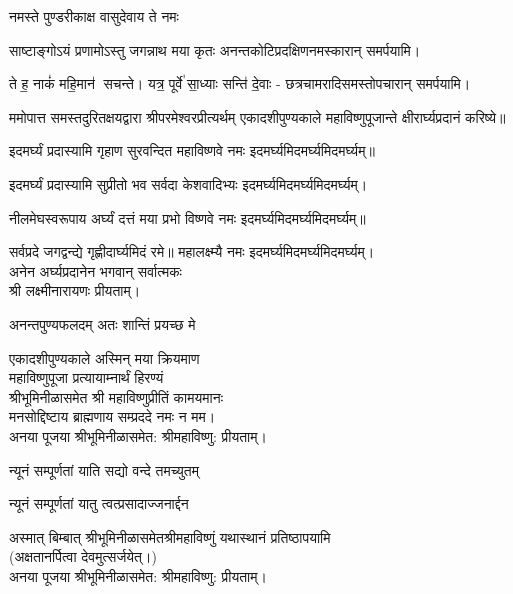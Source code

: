 {नमस्ते पुण्डरीकाक्ष वासुदेवाय ते नमः}

{साष्टाङ्गोऽयं प्रणामोऽस्तु जगन्नाथ मया कृतः}
अनन्तकोटिप्रदक्षिणनमस्कारान् समर्पयामि।\medskip

{ते ह॒ नाकं॑ महि॒मान॑ सचन्ते। यत्र॒ पूर्वे॑ सा॒ध्याः सन्ति॑ दे॒वाः}
- छत्रचामरादिसमस्तोपचारान् समर्पयामि।\medskip

ममोपात्त समस्तदुरितक्षयद्वारा श्रीपरमेश्वरप्रीत्यर्थम् एकादशीपुण्यकाले  महाविष्णुपूजान्ते क्षीरार्घ्यप्रदानं करिष्ये॥
\medskip

{इदमर्घ्यं प्रदास्यामि गृहाण सुरवन्दित}
	महाविष्णवे नमः इदमर्घ्यमिदमर्घ्यमिदमर्घ्यम्॥\medskip

{इदमर्घ्यं प्रदास्यामि सुप्रीतो भव सर्वदा}
	केशवादिभ्यः इदमर्घ्यमिदमर्घ्यमिदमर्घ्यम्।\medskip

{नीलमेघस्वरूपाय अर्घ्यं दत्तं मया प्रभो}
	विष्णवे नमः इदमर्घ्यमिदमर्घ्यमिदमर्घ्यम्॥\medskip

{सर्वप्रदे जगद्वन्द्ये गृह्णीदार्घ्यमिदं रमे॥}
	महालक्ष्म्यै नमः इदमर्घ्यमिदमर्घ्यमिदमर्घ्यम्।\\
अनेन अर्घ्यप्रदानेन भगवान् सर्वात्मकः\\ श्री लक्ष्मीनारायणः प्रीयताम्।\medskip

{अनन्तपुण्यफलदम् अतः शान्तिं प्रयच्छ मे}

एकादशीपुण्यकाले अस्मिन् मया क्रियमाण\\
महाविष्णुपूजा प्रत्यायाम्नार्थं हिरण्यं\\
श्रीभूमिनीळासमेत श्री महाविष्णुप्रीतिं कामयमानः\\
मनसोद्दिष्टाय ब्राह्मणाय सम्प्रददे नमः न मम।\\ 
अनया पूजया श्रीभूमिनीळासमेत: श्रीमहाविष्णु: प्रीयताम्। 
 
{न्यूनं सम्पूर्णतां याति सद्यो वन्दे तमच्युतम्}

{न्यूनं सम्पूर्णतां यातु त्वत्प्रसादाज्जनार्द्दन}\medskip

अस्मात् बिम्बात् श्रीभूमिनीळासमेतश्रीमहाविष्णुं यथास्थानं प्रतिष्ठापयामि\\
(अक्षतानर्पित्वा देवमुत्सर्जयेत्।)\\
अनया पूजया श्रीभूमिनीळासमेत: श्रीमहाविष्णु: प्रीयताम्।\medskip

